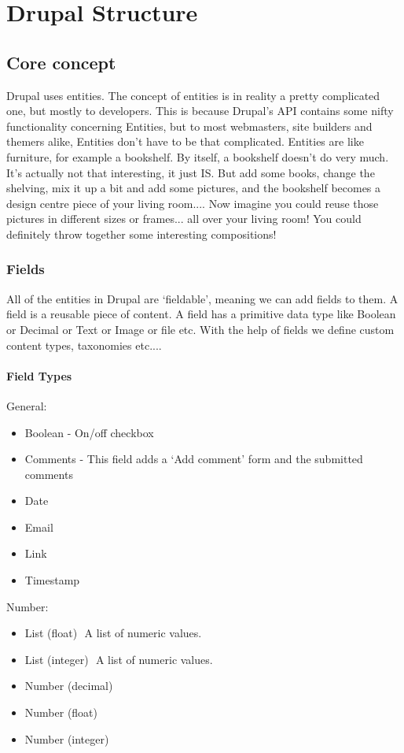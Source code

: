 \chapter{Drupal Structure}
\label{ch:drupal_structure}

\section{Core concept}
Drupal uses entities. The concept of entities is in reality a pretty complicated one, but mostly to developers. This is because Drupal’s API contains some nifty functionality concerning Entities, but to most webmasters, site builders and themers alike, Entities don’t have to be that complicated. 
Entities are like furniture, for example a bookshelf. By itself, a bookshelf doesn’t do very much. It’s actually not that interesting, it just IS. But add some books, change the shelving, mix it up a bit and add some pictures, and the bookshelf becomes a design centre piece of your living room.... Now imagine you could reuse those pictures in different sizes or frames... all over your living room! You could definitely throw together some interesting compositions! 
\subsection{Fields} 
All of the entities in Drupal are ‘fieldable’, meaning we can add fields to them. A field is a reusable piece of content. A field has a primitive data type like Boolean or Decimal or Text or Image or file etc. With the help of fields we define custom content types, taxonomies etc.... 

\subsubsection{Field Types} 
General: 
\begin{itemize}
    \item Boolean - On/off checkbox 
    \item Comments - This field adds a ‘Add comment’ form and the submitted comments 
    \item Date 
    \item E­mail 
    \item Link 
    \item Timestamp
\end{itemize}

Number: 
\begin{itemize}  
    \item List (float) ­ A list of numeric values. 
    \item List (integer) ­ A list of numeric values. 
    \item Number (decimal) 
    \item Number (float) 
    \item Number (integer) 
\end{itemize}

